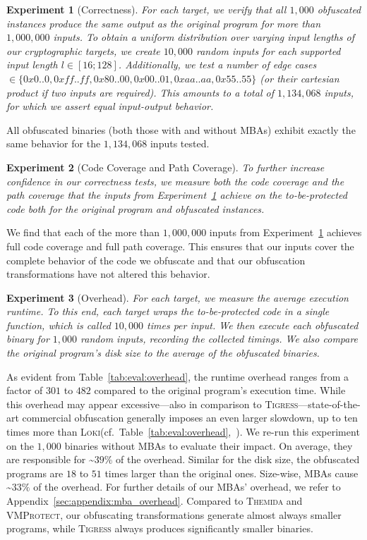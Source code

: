 \documentclass[letterpaper,twocolumn,10pt]{article}
\newcommand{\cf}{cf.\xspace}
\theoremstyle{customexample}
\theoremstyle{customexperiment}
\newtheorem{experiment}{Experiment}
\newcommand{\loki}{\textsc{Loki}\xspace}
\newcommand{\tigress}{\textsc{Tigress}\xspace}
\newcommand{\themida}{\textsc{Themida}\xspace}
\newcommand{\vmprotect}{\textsc{VMProtect}\xspace}
\begin{document}
\begin{experiment}[Correctness]\label{experiment:correctness}
For each target, we verify that all $1,000$ obfuscated instances produce the same output as the original program for more than $1,000,000$ inputs.
To obtain a uniform distribution over varying input lengths of our cryptographic targets, we create $10,000$ random inputs for each supported input length $l \in [16;128]$. Additionally, we test a number of edge cases $\in \{0x0..0, 0xff..ff, 0x80..00, 0x00..01, 0xaa..aa, 0x55..55\}$ (or their cartesian product if two inputs are required). This amounts to a total of $1,134,068$ inputs, for which we assert equal input-output behavior.
\end{experiment}

All obfuscated binaries (both those with and without MBAs) exhibit exactly the same behavior for the $1,134,068$ inputs tested. 
\begin{experiment}[Code Coverage and Path Coverage]\label{experiment:coverage}
To further increase confidence in our correctness tests, we measure both the code coverage and the path coverage that the inputs from Experiment~\ref{experiment:correctness} achieve on the to-be-protected code both for the original program and obfuscated instances.
\end{experiment}
We find that each of the more than $1,000,000$ inputs from Experiment~\ref{experiment:correctness} achieves full code coverage and full path coverage. This ensures that our inputs cover the complete behavior of the code we obfuscate and that our obfuscation transformations have not altered this behavior.

\begin{experiment}[Overhead]\label{experiment:overhead}
For each target, we measure the average execution runtime. To this end, each target wraps the to-be-protected code in a single function, which is called $10,000$ times per input. We then execute each obfuscated binary for $1,000$ random inputs, recording the collected timings. 
We also compare the original program's disk size to the average of the obfuscated binaries.
\end{experiment}

As evident from Table~\ref{tab:eval:overhead}, the runtime overhead ranges from a factor of $301$ to $482$ compared to the original program's execution time.
While this overhead may appear excessive---also in comparison to \tigress---state-of-the-art commercial obfuscation generally imposes an even larger slowdown, up to ten times more than \loki (\cf~Table~\ref{tab:eval:overhead},~\cite{tigressblog}).
We re-run this experiment on the $1,000$ binaries without MBAs to evaluate their impact. On average, they are responsible for \textasciitilde$39\%$ of the overhead. 
Similar for the disk size, the obfuscated programs are $18$ to $51$ times larger than the original ones. Size-wise, MBAs cause \textasciitilde$33\%$ of the overhead. For further details of our MBAs' overhead, we refer to Appendix~\ref{sec:appendix:mba_overhead}.
Compared to \themida and \vmprotect, our obfuscating transformations generate almost always smaller programs, while \tigress always produces significantly smaller binaries. 
 
\end{document}
